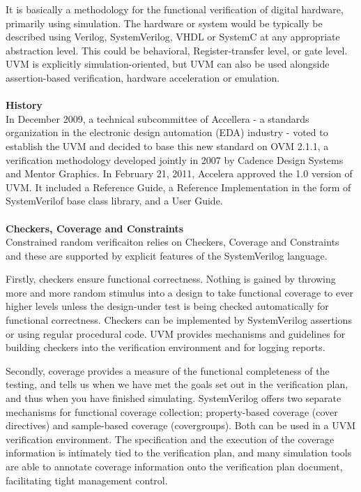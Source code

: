 \documentclass[a4paper,11pt]{article}
\begin{document}
It is basically a methodology for the functional verification of digital hardware, primarily using simulation. The hardware or system would be typically be described using Verilog, SystemVerilog, VHDL or SystemC at any appropriate abstraction level. This could be behavioral, Register-transfer level, or gate level. UVM is explicitly simulation-oriented, but UVM can also be used alongside assertion-based verification, hardware acceleration or emulation.
\ \\
\ \\
\textbf{History}
\ \\
In December 2009, a technical subcommittee of Accellera - a standards organization in the electronic design automation (EDA) industry - voted to establish the UVM and decided to base this new standard on OVM 2.1.1, a verification methodology developed jointly in 2007 by Cadence Design Systems and Mentor Graphics.
In February 21, 2011, Accelera approved the 1.0 version of UVM. It included a Reference Guide, a Reference Implementation in the form of SystemVerilof base class library, and a User Guide.
\ \\
\ \\
\textbf{Checkers, Coverage and Constraints}
\ \\
Constrained random verificaiton relies on Checkers, Coverage and Constraints and these are supported by explicit features of the SystemVerilog language.

Firstly, checkers ensure functional correctness. Nothing is gained by throwing more and more random stimulus into a design to take functional coverage to ever higher levels unless the design-under test is being checked automatically for functional correctness. Checkers can be implemented by SystemVerilog assertions or using regular procedural code. UVM provides mechanisms and guidelines for building checkers into the verification environment and for logging reports.

Secondly, coverage provides a measure of the functional completeness of the testing, and tells us when we have met the goals set out in the verification plan, and thus when you have finished simulating. SystemVerilog offers two separate mechanisms for functional coverage collection; property-based coverage (cover directives) and sample-based coverage (covergroups). Both can be used in a UVM verification environment. The specification and the execution of the coverage information is intimately tied to the verification plan, and many simulation tools are able to annotate coverage information onto the verification plan document, facilitating tight management control.
\end{document}
